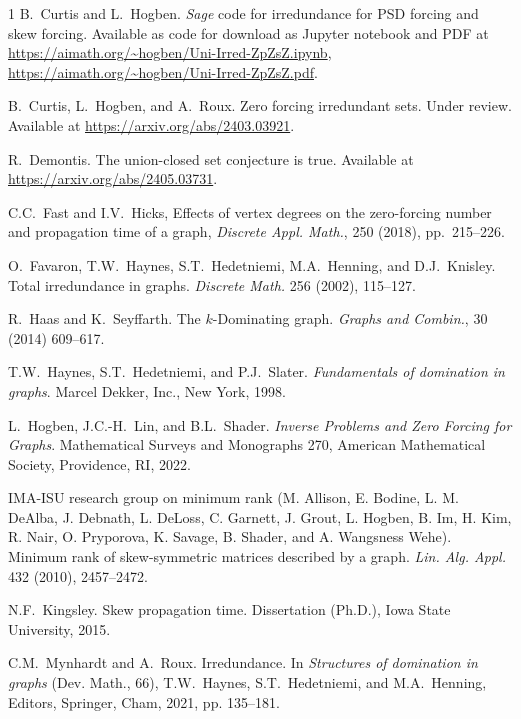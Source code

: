 \documentclass{article}
\numberwithin{figure}{section}
\numberwithin{table}{section}
\numberwithin{equation}{section}
\theoremstyle{definition}
\theoremstyle{definition}
\theoremstyle{definition}
\begin{document}
{\begin{thebibliography}{1}
 B.~Curtis and L.~Hogben. {\em Sage} code for irredundance for PSD forcing and skew forcing. %
Available  as code for download as Jupyter notebook and  PDF  at  \url{https://aimath.org/~hogben/Uni-Irred-ZpZsZ.ipynb}, \url{https://aimath.org/~hogben/Uni-Irred-ZpZsZ.pdf}. 




 B.~Curtis, L.~Hogben, and A.~Roux. Zero forcing irredundant sets. Under review.  Available at \url{https://arxiv.org/abs/2403.03921}.


R.~Demontis. The union-closed set conjecture is true.  Available at \url{https://arxiv.org/abs/2405.03731}.



{C.C.~Fast and I.V.~Hicks}, {Effects of vertex degrees on the
  zero-forcing number and propagation time of a graph}, {\em Discrete Appl.
  Math.}, 250 (2018), pp.~215--226.


O.~Favaron, T.W.~Haynes, S.T.~Hedetniemi, M.A.~Henning, and D.J.~Knisley. Total irredundance in graphs. 
\emph{Discrete Math.} 256 (2002),  115--127.

 R.~Haas and K.~Seyffarth. The $k$-Dominating graph. \emph{Graphs and Combin.}, 30 (2014) 609--617. 



 T.W.~Haynes, S.T.~Hedetniemi, and P.J.~Slater.
\emph{Fundamentals of domination in graphs}. %
Marcel Dekker, Inc., New York, 1998.


  L.~Hogben, J.C.-H.~Lin, and B.L.~Shader. {\em Inverse Problems and Zero Forcing for Graphs}. {Mathematical Surveys and Monographs} {270}, American Mathematical Society, Providence, RI,  2022. 

 
 IMA-ISU research group on minimum rank (M. Allison,   E. Bodine, L. M.  DeAlba, J. Debnath, L. DeLoss, C. Garnett, J. Grout, L. Hogben, B. Im, H. Kim, R. Nair, O. Pryporova, K. Savage, B.  Shader, and A. Wangsness Wehe).  Minimum rank of skew-symmetric matrices described by a graph.   {\em Lin. Alg. Appl.} 432 (2010), 2457--2472.


 N.F.~Kingsley.  Skew propagation time. Dissertation (Ph.D.), Iowa State  University, 2015.

 C.M.~Mynhardt and A.~Roux. Irredundance. In \emph{Structures of domination in graphs} (Dev. Math., 66), T.W.~Haynes, S.T.~Hedetniemi, and M.A.~Henning, Editors, Springer, Cham, 2021, pp.  135--181.



\end{thebibliography}}
\end{document}
